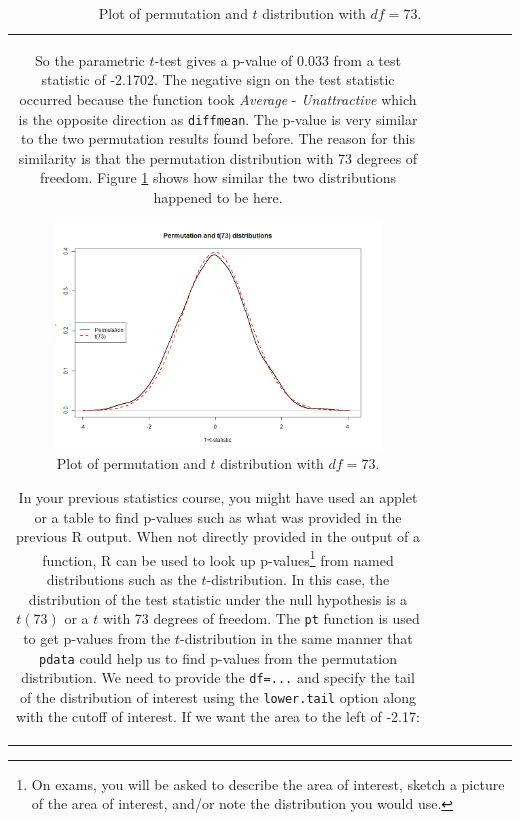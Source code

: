\documentclass[]{book}
\newenvironment{Shaded}{\begin{snugshade}}{\end{snugshade}}
\let\rmarkdownfootnote\footnote%
\def\footnote{\protect\rmarkdownfootnote}
\theoremstyle{definition}
\theoremstyle{definition}
\theoremstyle{remark}
\begin{document}
\begin{longtable}[]{@{}ccccccc@{}}
\begin{minipage}[b]{0.10\columnwidth}
\begin{Shaded}
\begin{Highlighting}[]
So the parametric \(t\)-test gives a p-value of 0.033 from a test
statistic of -2.1702. The negative sign on the test statistic occurred
because the function took \emph{Average} - \emph{Unattractive} which is
the opposite direction as \texttt{diffmean}. The p-value is very similar
to the two permutation results found before. The reason for this
similarity is that the permutation distribution with 73 degrees of
freedom. Figure \ref{fig:Figure2-14} shows how similar the two
distributions happened to be here.



\begin{figure}
\centering
\includegraphics{chapter1_files/image047small.png}
\caption{\label{fig:Figure2-14}Plot of permutation and \(t\) distribution with \(df=73\).}
\end{figure}

In your previous statistics course, you might have used an applet or a
table to find p-values such as what was provided in the previous R
output. When not directly provided in the output of a function, R can be
used to look up p-values\footnote{On exams, you will be asked to
  describe the area of interest, sketch a picture of the area of
  interest, and/or note the distribution you would use.} from named
distributions such as the \(t\)-distribution. In this case, the
distribution of the test statistic under the null hypothesis is a
\(t(73)\) or a \(t\) with 73 degrees of freedom. The \texttt{pt}
function is used to get p-values from the \(t\)-distribution in the same
manner that \texttt{pdata} could help us to find p-values from the
permutation distribution. We need to provide the \texttt{df=...} and
specify the tail of the distribution of interest using the
\texttt{lower.tail} option along with the cutoff of interest. If we want
the area to the left of -2.17:


\end{Highlighting}
\end{Shaded}
\end{minipage}
\end{longtable}
\end{document}
